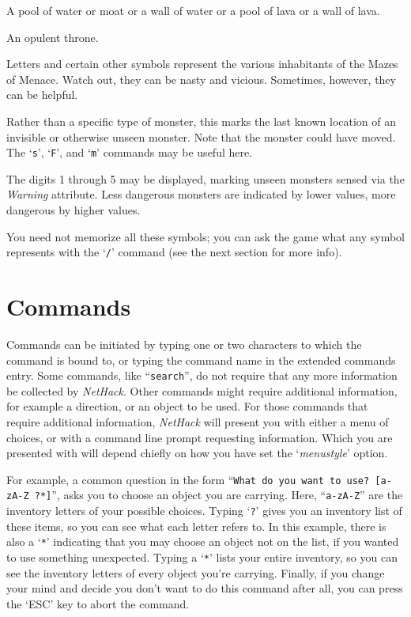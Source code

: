 \documentclass[titlepage]{article}
\begin{document}
\begin{description}[font=\mdseries\ttfamily]
A pool of water or moat or a wall of water
or a pool of lava or a wall of lava.
\item[\textbackslash]
An opulent throne.
\item[a-z \textrm{\textmd{and}}]
\item[A-HJ-Z \textrm{\textmd{and}}]
\item[@\&\textquotesingle :;]
Letters and certain other symbols represent the various inhabitants
of the Mazes of Menace.
Watch out, they can be nasty and vicious.
Sometimes, however, they can be helpful.
\item[I]
Rather than a specific type of monster, this marks the last known
location of an invisible or otherwise unseen monster.
Note that the monster could have moved.
The `\texttt{s}', `\texttt{F}', and `\texttt{m}' commands may be useful here.
\item[1-5]
The digits 1 through 5 may be displayed, marking unseen monsters sensed
via the \textit{Warning} attribute.
Less dangerous monsters are indicated by lower values, more dangerous by
higher values.

\end{description}
You need not memorize all these symbols; you can ask the game what any
symbol represents with the `\texttt{/}' command (see the next section for
more info).

\section{Commands}

Commands can be initiated by typing one or two characters to which
the command is bound to, or typing the command name in the extended
commands entry.  Some commands,
like ``\texttt{search}'', do not require that any more information be collected
by \textit{NetHack}.  Other commands might require additional information, for
example a direction, or an object to be used.  For those commands that
require additional information, \textit{NetHack} will present you with either
a menu of choices, or with a command line prompt requesting information.
Which you are presented with will depend chiefly on how you have set the
`\textit{menustyle}'
option.

For example, a common question in the form ``\texttt{What do you want to
use? [a-zA-Z\ ?*]}'', asks you to choose an object you are carrying.
Here, ``\texttt{a-zA-Z}'' are the inventory letters of your possible choices.
Typing `\texttt{?}' gives you an inventory list of these items, so you can see
what each letter refers to.  In this example, there is also a `\texttt{*}'
indicating that you may choose an object not on the list, if you
wanted to use something unexpected.  Typing a `\texttt{*}' lists your entire
inventory, so you can see the inventory letters of every object you're
carrying.  Finally, if you change your mind and decide you don't want
to do this command after all, you can press the `ESC' key to abort the
command.
\end{document}
